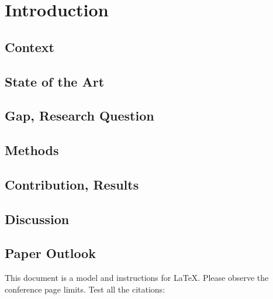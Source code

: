\section{Introduction}

\subsection{Context}                %
\subsection{State of the Art}       %
\subsection{Gap, Research Question} %
\subsection{Methods}                %
\subsection{Contribution, Results}  %
\subsection{Discussion}             %
\subsection{Paper Outlook}          %

This document is a model and instructions for \LaTeX.
Please observe the conference page limits. Test all the citations:
\cite{Bogdoll_Compressing_2021_NeurIPS}
\cite{Bogdoll_Description_2021_ICCV}
\cite{Bogdoll_KIGLIS_2021_ISC2}
\cite{Bogdoll_Taxonomy_2021_arXiv}
\cite{Toettel_Reliving_2021_arXiv}
\cite{Reichert_Towards_2021_ISC2}
\cite{Koduri_Aureate_2018_WCX}